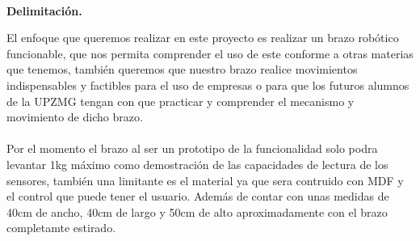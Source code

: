 \documentclass[letterpaper]{article}
\begin{document}
\vspace{1.8cm}\\
\begin{large}
    \begin{LARGE}
        \textbf{Delimitación.}\\
    \end{LARGE}
  El enfoque que queremos realizar en este proyecto es realizar un brazo robótico funcionable, que nos permita comprender el uso de este conforme a otras materias que tenemos, también queremos que nuestro brazo realice movimientos indispensables y factibles para el uso de empresas o para que los futuros alumnos de la UPZMG tengan con que practicar y comprender el mecanismo y movimiento de dicho brazo.\\\\
  Por el momento el brazo al ser un prototipo de la funcionalidad solo podra levantar 1kg máximo como demostración de las capacidades de lectura de los sensores, también una limitante es el material ya que sera contruido con MDF y el control que puede tener el usuario. Además de contar con unas medidas de 40cm de ancho, 40cm de largo y 50cm de alto aproximadamente con el brazo completamte estirado. 
\end{large}
\end{document}
